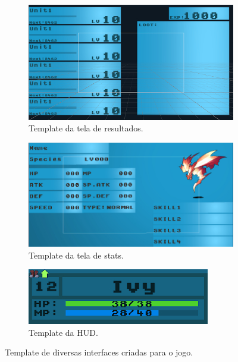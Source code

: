 \begin{figure}[h!]
  \centering
  \begin{subfigure}[b]{0.55\linewidth}
    \includegraphics[width=\linewidth]{resultstemplate.jpg}
     \caption{Template da tela de resultados.}
  \end{subfigure}
  \begin{subfigure}[b]{0.55\linewidth}
    \includegraphics[width=\linewidth]{statstemplate.jpg}
    \caption{Template da tela de stats.}
  \end{subfigure}
  \begin{subfigure}[b]{0.55\linewidth}
    \includegraphics[width=\linewidth]{hudtemplate.jpg}
    \caption{Template da HUD.}
  \end{subfigure}
  \caption{Template de diversas interfaces criadas para o jogo.}
  \label{fig:interfaces}
\end{figure}

